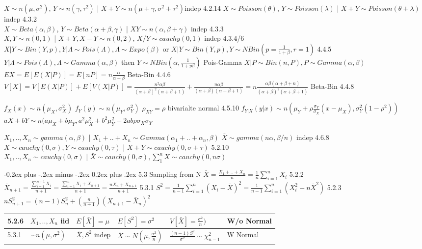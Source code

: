 \documentclass[10pt,landscape]{article}
\makeatletter
\renewcommand{\subsection}{\@startsection{subsection}{2}{0mm}%
                                {-0.2ex plus -.2ex minus -.2ex}%
                                {0.2ex plus .2ex}%
                                {\normalfont\normalsize\bfseries}}
\makeatother
\begin{document}
\begin{multicols}{1}
$X\sim n(\mu,\sigma^2)$, $Y\sim n(\gamma,\tau^2)$ | $X+Y\sim n(\mu+\gamma,\sigma^2+\tau^2)$indep  4.2.14 
$X\sim Poisson(\theta)$, $Y\sim Poisson(\lambda)$ | $X+Y\sim Poisson(\theta+\lambda)$ indep 4.3.2 \\
$X\sim Beta(\alpha,\beta)$, $Y\sim Beta(\alpha+\beta,\gamma)$ | $XY\sim n(\alpha,\beta+\gamma)$ indep 4.3.3\\
$X, Y\sim n(0,1)$ | $X+Y, X-Y\sim n(0,2)$, $X/Y\sim cauchy(0,1)$ indep 4.3.4/6 \\
$X|Y\sim Bin(Y,p), Y|\Lambda\sim Pois(\Lambda), \Lambda\sim Expo(\beta)$ or $X|Y\sim Bin(Y,p), Y\sim NBin(p=\frac1{1+\beta},r=1)$ 4.4.5
$Y|\Lambda\sim Pois(\Lambda), \Lambda\sim Gamma(\alpha,\beta)$ then $Y\sim NBin(\alpha,\frac1{1+p\beta})$ Pois-Gamma
$X|P\sim Bin(n,P), P\sim Gamma(\alpha,\beta)$ $EX=E[E(X|P)]=E[nP]=n\frac{\alpha}{\alpha+\beta}$ Beta-Bin 4.4.6
$V[X]=V[E(X|P)]+E[V(X|P)]=\frac{n^2\alpha\beta}{(\alpha+\beta)^2(\alpha+\beta+1)}+\frac{n\alpha\beta}{(\alpha+\beta)(\alpha+\beta+1)}=n\frac{\alpha\beta(\alpha+\beta+n)}{(\alpha+\beta)^2(\alpha+\beta+1)}$ Beta-Bin 4.4.8 

$f_X(x)\sim n(\mu_X,\sigma^2_X)$ $f_Y(y)\sim n(\mu_Y,\sigma^2_Y)$ $\rho_{XY}=\rho$ bivarialte normal 4.5.10
$f_{Y|X}(y|x) \sim n\left(\mu_Y+\rho\frac{\sigma_Y}{\sigma_X}(x-\mu_X),\sigma_Y^2(1-\rho^2)\right)$
$aX+bY\sim n(a\mu_X+b\mu_Y,a^2\mu_X^2+b^2\mu_Y^2+2ab\rho\sigma_X\sigma_Y$

$X_1,..,X_n\sim gamma(\alpha,\beta)$ | $X_1+..+X_n\sim Gamma(\alpha_1+..+\alpha_n,\beta)$ $\bar X\sim gamma(n\alpha,\beta/n)$ indep 4.6.8\\
$X\sim cauchy(0,\sigma), Y\sim cauchy(0,\tau)$ | $X+Y\sim cauchy(0,\sigma+\tau)$ 5.2.10\\
$X_1,..,X_n\sim cauchy(0,\sigma)$ | $\bar X\sim cauchy(0,\sigma),\sum_{1}^{n} X\sim cauchy(0,n\sigma)$

\subsection{5.3 Sampling from N}
$\bar X=\frac{X_1+..+X_n}{n}=\frac1n\sum_{i=1}^nX_i$ 5.2.2 $\bar X_{n+1}=\frac{\sum_{i=1}^{n+1}X_{i}}{n+1}=\frac{\sum_{i=1}^{n}X_{i}+X_{n+1}}{n+1}=\frac{n\bar X_{n}+X_{n+1}}{n+1}$ 5.3.1
$S^2=\frac1{n-1}\sum_{i=1}^n(X_i-\bar X)^2=\frac1{n-1}\sum_{i=1}^n(X_i^2-n\bar X^2)$ 5.2.3 $nS^2_{n+1}=(n-1)S_n^2+(\frac{n}{n+1})(X_{n+1}-\bar X_n)^2$

\begin{tabular}{l|l|l|l|l|l}
5.2.6 & $X_1,..,X_n$ iid  & $E[\bar X]=\mu$ & $E[S^2]=\sigma^2$ & $V[\bar X]=\frac{\sigma^2}n)$ & W/o Normal\\\hline
5.3.1 & $\sim n(\mu,\sigma^2)$ & $\bar X,S^2$ indep & $\bar X\sim N(\mu,\frac{\sigma^2}n)$ & $\frac{(n-1)S^2}{\sigma^2}\sim\chi^2_{n-1}$ & W  Normal\\
\end{tabular}


\end{multicols}
\end{document}
